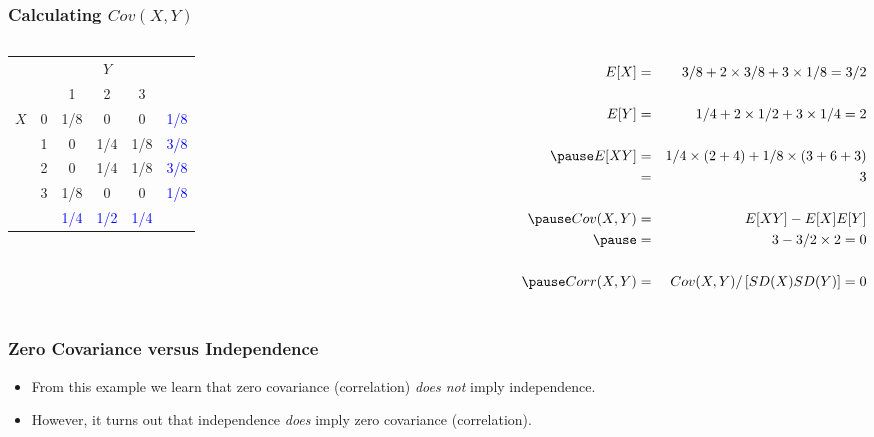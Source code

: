 \documentclass[handout]{beamer}
\begin{document}
\begin{frame}
\frametitle{Calculating $Cov(X,Y)$}

\begin{columns}

\begin{table}
\footnotesize
\begin{tabular}{|cc|ccc|c|}
\hline
&&\multicolumn{3}{c|}{$Y$}&\\
&&1 & 2&3&\\
\hline
\multirow{4}{*}{$X$}
&0& \multicolumn{1}{|c}{\alert{1/8}} & \alert{0}& \alert{0}&\textcolor{blue}{1/8}\\
&1& \multicolumn{1}{|c}{\alert{0}} & \alert{1/4}&\alert{1/8}&\textcolor{blue}{3/8}\\
&2& \multicolumn{1}{|c}{\alert{0}} & \alert{1/4}&\alert{1/8}&\textcolor{blue}{3/8}\\
&3& \multicolumn{1}{|c}{\alert{1/8}} & \alert{0}&\alert{0}&\textcolor{blue}{1/8}\\
\hline
&&\textcolor{blue}{1/4}&\textcolor{blue}{1/2}&\textcolor{blue}{1/4}&\\
\hline
\end{tabular}
\vspace{6em}
\end{table}


\footnotesize
\begin{eqnarray*}
	E[X] &=&3/8 + 2 \times 3/8 + 3 \times 1/8 = 3/2\\\\ 
	E[Y] &=&1/4 + 2 \times 1/2 + 3 \times 1/4 = 2 \\ \\ \pause
	E[XY] &=& 1/4\times ( 2 + 4) + 1/8 \times (3 + 6 + 3)\\ 
		&=& 3\\ \\ \pause
	Cov(X,Y) &=& E[XY] - E[X]E[Y]\\ \pause
			&=& 3 - 3/2\times 2 = 0\\\\ \pause
	Corr(X,Y) &=& Cov(X,Y)/\left[SD(X) SD(Y) \right] = 0
\end{eqnarray*}

\end{columns}

\end{frame}
\begin{frame}
  \frametitle{Zero Covariance versus Independence}
  \begin{itemize}
    \item From this example we learn that zero covariance (correlation) \emph{does not} imply independence.
    \vspace{0.2in}
    \item However, it turns out that independence \emph{does} imply zero covariance (correlation).
  \end{itemize}

\end{frame}
\end{document}
